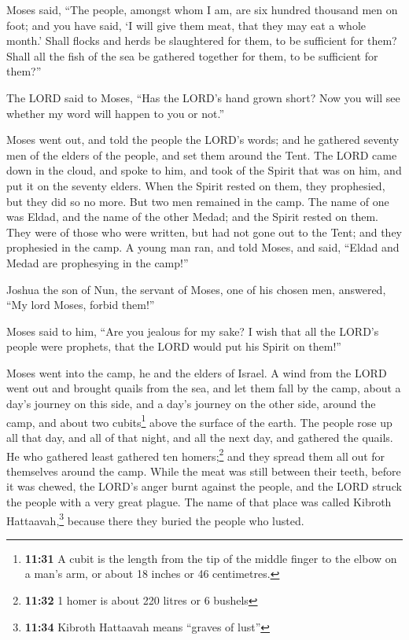  Moses said, ``The people, amongst whom I am, are six
hundred thousand men on foot; and you have said, `I will give them meat,
that they may eat a whole month.'  Shall flocks and herds
be slaughtered for them, to be sufficient for them? Shall all the fish
of the sea be gathered together for them, to be sufficient for them?''

 The LORD said to Moses, ``Has the LORD's hand grown
short? Now you will see whether my word will happen to you or not.''

 Moses went out, and told the people the LORD's words;
and he gathered seventy men of the elders of the people, and set them
around the Tent.  The LORD came down in the cloud, and
spoke to him, and took of the Spirit that was on him, and put it on the
seventy elders. When the Spirit rested on them, they prophesied, but
they did so no more.  But two men remained in the camp.
The name of one was Eldad, and the name of the other Medad; and the
Spirit rested on them. They were of those who were written, but had not
gone out to the Tent; and they prophesied in the camp.  A
young man ran, and told Moses, and said, ``Eldad and Medad are
prophesying in the camp!''

 Joshua the son of Nun, the servant of Moses, one of his
chosen men, answered, ``My lord Moses, forbid them!''

 Moses said to him, ``Are you jealous for my sake? I wish
that all the LORD's people were prophets, that the LORD would put his
Spirit on them!''

 Moses went into the camp, he and the elders of Israel.
 A wind from the LORD went out and brought quails from
the sea, and let them fall by the camp, about a day's journey on this
side, and a day's journey on the other side, around the camp, and about
two cubits\footnote{\textbf{11:31} A cubit is the length from the tip of
  the middle finger to the elbow on a man's arm, or about 18 inches or
  46 centimetres.} above the surface of the earth.  The
people rose up all that day, and all of that night, and all the next
day, and gathered the quails. He who gathered least gathered ten
homers;\footnote{\textbf{11:32} 1 homer is about 220 litres or 6 bushels}
and they spread them all out for themselves around the camp.
 While the meat was still between their teeth, before it
was chewed, the LORD's anger burnt against the people, and the LORD
struck the people with a very great plague.  The name of
that place was called Kibroth Hattaavah,\footnote{\textbf{11:34} Kibroth
  Hattaavah means ``graves of lust''} because there they buried the
people who lusted.


